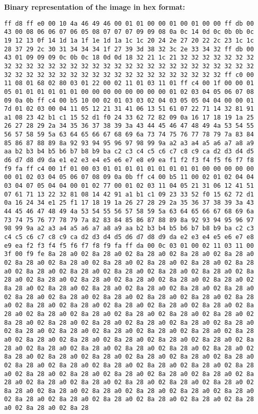 \documentclass{article}
\begin{document}
\textbf{Binary representation of the image in hex format:}

\begin{verbatim}
ff d8 ff e0 00 10 4a 46 49 46 00 01 01 00 00 01 00 01 00 00 ff db 00 43 00 08 06 06 07 06 05 08 07 07 07 09 09 08 0a 0c 14 0d 0c 0b 0b 0c 19 12 13 0f 14 1d 1a 1f 1e 1d 1a 1c 1c 20 24 2e 27 20 22 2c 23 1c 1c 28 37 29 2c 30 31 34 34 34 1f 27 39 3d 38 32 3c 2e 33 34 32 ff db 00 43 01 09 09 09 0c 0b 0c 18 0d 0d 18 32 21 1c 21 32 32 32 32 32 32 32 32 32 32 32 32 32 32 32 32 32 32 32 32 32 32 32 32 32 32 32 32 32 32 32 32 32 32 32 32 32 32 32 32 32 32 32 32 32 32 32 32 32 32 ff c0 00 11 08 01 68 02 80 03 01 22 00 02 11 01 03 11 01 ff c4 00 1f 00 00 01 05 01 01 01 01 01 01 00 00 00 00 00 00 00 00 01 02 03 04 05 06 07 08 09 0a 0b ff c4 00 b5 10 00 02 01 03 03 02 04 03 05 05 04 04 00 00 01 7d 01 02 03 00 04 11 05 12 21 31 41 06 13 51 61 07 22 71 14 32 81 91 a1 08 23 42 b1 c1 15 52 d1 f0 24 33 62 72 82 09 0a 16 17 18 19 1a 25 26 27 28 29 2a 34 35 36 37 38 39 3a 43 44 45 46 47 48 49 4a 53 54 55 56 57 58 59 5a 63 64 65 66 67 68 69 6a 73 74 75 76 77 78 79 7a 83 84 85 86 87 88 89 8a 92 93 94 95 96 97 98 99 9a a2 a3 a4 a5 a6 a7 a8 a9 aa b2 b3 b4 b5 b6 b7 b8 b9 ba c2 c3 c4 c5 c6 c7 c8 c9 ca d2 d3 d4 d5 d6 d7 d8 d9 da e1 e2 e3 e4 e5 e6 e7 e8 e9 ea f1 f2 f3 f4 f5 f6 f7 f8 f9 fa ff c4 00 1f 01 00 03 01 01 01 01 01 01 01 01 01 00 00 00 00 00 00 01 02 03 04 05 06 07 08 09 0a 0b ff c4 00 b5 11 00 02 01 02 04 04 03 04 07 05 04 04 00 01 02 77 00 01 02 03 11 04 05 21 31 06 12 41 51 07 61 71 13 22 32 81 08 14 42 91 a1 b1 c1 09 23 33 52 f0 15 62 72 d1 0a 16 24 34 e1 25 f1 17 18 19 1a 26 27 28 29 2a 35 36 37 38 39 3a 43 44 45 46 47 48 49 4a 53 54 55 56 57 58 59 5a 63 64 65 66 67 68 69 6a 73 74 75 76 77 78 79 7a 82 83 84 85 86 87 88 89 8a 92 93 94 95 96 97 98 99 9a a2 a3 a4 a5 a6 a7 a8 a9 aa b2 b3 b4 b5 b6 b7 b8 b9 ba c2 c3 c4 c5 c6 c7 c8 c9 ca d2 d3 d4 d5 d6 d7 d8 d9 da e2 e3 e4 e5 e6 e7 e8 e9 ea f2 f3 f4 f5 f6 f7 f8 f9 fa ff da 00 0c 03 01 00 02 11 03 11 00 3f 00 f9 fe 8a 28 a0 02 8a 28 a0 02 8a 28 a0 02 8a 28 a0 02 8a 28 a0 02 8a 28 a0 02 8a 28 a0 02 8a 28 a0 02 8a 28 a0 02 8a 28 a0 02 8a 28 a0 02 8a 28 a0 02 8a 28 a0 02 8a 28 a0 02 8a 28 a0 02 8a 28 a0 02 8a 28 a0 02 8a 28 a0 02 8a 28 a0 02 8a 28 a0 02 8a 28 a0 02 8a 28 a0 02 8a 28 a0 02 8a 28 a0 02 8a 28 a0 02 8a 28 a0 02 8a 28 a0 02 8a 28 a0 02 8a 28 a0 02 8a 28 a0 02 8a 28 a0 02 8a 28 a0 02 8a 28 a0 02 8a 28 a0 02 8a 28 a0 02 8a 28 a0 02 8a 28 a0 02 8a 28 a0 02 8a 28 a0 02 8a 28 a0 02 8a 28 a0 02 8a 28 a0 02 8a 28 a0 02 8a 28 a0 02 8a 28 a0 02 8a 28 a0 02 8a 28 a0 02 8a 28 a0 02 8a 28 a0 02 8a 28 a0 02 8a 28 a0 02 8a 28 a0 02 8a 28 a0 02 8a 28 a0 02 8a 28 a0 02 8a 28 a0 02 8a 28 a0 02 8a 28 a0 02 8a 28 a0 02 8a 28 a0 02 8a 28 a0 02 8a 28 a0 02 8a 28 a0 02 8a 28 a0 02 8a 28 a0 02 8a 28 a0 02 8a 28 a0 02 8a 28 a0 02 8a 28 a0 02 8a 28 a0 02 8a 28 a0 02 8a 28 a0 02 8a 28 a0 02 8a 28 a0 02 8a 28 a0 02 8a 28 a0 02 8a 28 a0 02 8a 28 a0 02 8a 28 a0 02 8a 28 a0 02 8a 28 a0 02 8a 28 a0 02 8a 28 a0 02 8a 28 a0 02 8a 28 a0 02 8a 28 a0 02 8a 28 a0 02 8a 28 a0 02 8a 28 a0 02 8a 28 a0 02 8a 28 a0 02 8a 28 a0 02 8a 28 a0 02 8a 28 a0 02 8a 28 a0 02 8a 28 a0 02 8a 28 a0 02 8a 28 a0 02 8a 28 a0 02 8a 28 a0 02 8a 28 a0 02 8a 28 a0 02 8a 28 a0 02 8a 28 a0 02 8a 28 
\end{verbatim}
\end{document}
